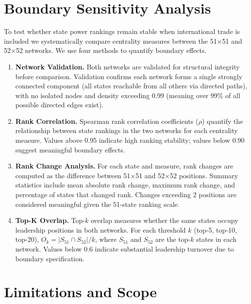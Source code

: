 \documentclass[12pt,oneside]{book}
\begin{document}
\section{Boundary Sensitivity Analysis}

To test whether state power rankings remain stable when international trade is included we systematically compare centrality measures between the 51$\times$51 and 52$\times$52 networks. We use four methods to quantify boundary effects. 

\begin{enumerate}
    \item \textbf{Network Validation.} Both networks are validated for structural integrity before comparison. Validation confirms each network forms a single strongly connected component (all states reachable from all others via directed paths), with no isolated nodes and density exceeding 0.99 (meaning over 99\% of all possible directed edges exist).

    \item \textbf{Rank Correlation.} Spearman rank correlation coefficients ($\rho$) quantify the relationship between state rankings in the two networks for each centrality measure. Values above 0.95 indicate high ranking stability; values below 0.90 suggest meaningful boundary effects.

    \item \textbf{Rank Change Analysis.} For each state and measure, rank changes are computed as the difference between 51×51 and 52×52 positions. Summary statistics include mean absolute rank change, maximum rank change, and percentage of states that changed rank. Changes exceeding 2 positions are considered meaningful given the 51-state ranking scale.

    \item \textbf{Top-K Overlap.} Top-$k$ overlap measures whether the same states occupy leadership positions in both networks. For each threshold $k$ (top-5, top-10, top-20), $O_k = |S_{51} \cap S_{52}| / k$, where $S_{51}$ and $S_{52}$ are the top-$k$ states in each network. Values below 0.6 indicate substantial leadership turnover due to boundary specification.
    

\end{enumerate}

\section{Limitations and Scope}
\end{document}
